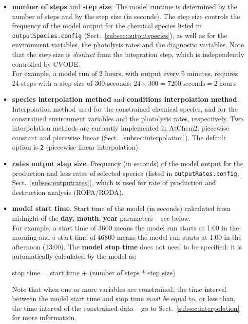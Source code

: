 \begin{itemize}
\item \textbf{number of steps} and \textbf{step size}. The model
  runtime is determined by the number of steps and by the step size
  (in seconds). The step size controls the frequency of the model
  output for the chemical species listed in \texttt{outputSpecies.config}
  (Sect.~\ref{subsec:outputspecies}), as well as for the environment
  variables, the photolysis rates and the diagnostic variables. Note
  that the step size is \emph{distinct} from the integration step,
  which is independently controlled by CVODE.\\
  For example, a model run of 2 hours, with output every 5 minutes,
  requires 24 steps with a step size of 300 seconds:
  $24 \times 300 = 7200~\mathrm{seconds} = 2~\mathrm{hours}$
\item \textbf{species interpolation method} and
  \textbf{conditions interpolation method}. Interpolation method used
  for the constrained chemical species, and for the constrained environment
  variables and the photolysis rates, respectively. Two interpolation
  methods are currently implemented in AtChem2: piecewise constant and
  piecewise linear (Sect.~\ref{subsec:interpolation}). The default
  option is \texttt{2} (piecewise linear interpolation).
\item \textbf{rates output step size}. Frequency (in seconds) of the
  model output for the production and loss rates of selected species
  (listed in \texttt{outputRates.config}, Sect.~\ref{subsec:outputrates}),
  which is used for rate of production and destruction analysis
  (ROPA/RODA).
\item \textbf{model start time}. Start time of the model (in seconds)
  calculated from midnight of the \textbf{day}, \textbf{month},
  \textbf{year} parameters -- see below.\\
  For example, a start time of 3600 means the model run starts at 1:00
  in the morning and a start time of 46800 means the model run starts
  at 1:00 in the afternoon (13:00). The \textbf{model stop time} does
  not need to be specified: it is automatically calculated by the
  model as:
  \begin{center}
    stop time = start time + (number of steps * step size)
  \end{center}
  Note that when one or more variables are constrained, the time
  interval between the model start time and stop time \emph{must be}
  equal to, or less than, the time interval of the constrained data --
  go to Sect.~\ref{subsec:interpolation} for more information.

\end{itemize}
